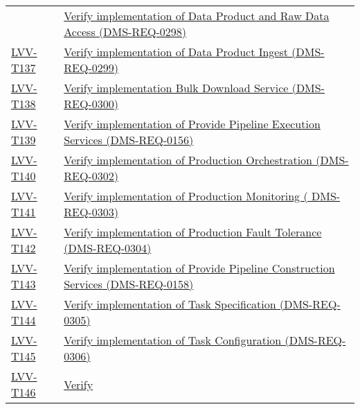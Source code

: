 \begin{longtable}[]{@{}ll@{}}
&
\href{https://jira.lsstcorp.org/secure/Tests.jspa\#/testCase/LVV-T136}{Verify
implementation of Data Product and Raw Data Access
(DMS-REQ-0298)}\tabularnewline
\protect\hyperlink{lvv-t137---verify-implementation-of-data-product-ingest-dms-req-0299}{LVV-T137}
&
\href{https://jira.lsstcorp.org/secure/Tests.jspa\#/testCase/LVV-T137}{Verify
implementation of Data Product Ingest (DMS-REQ-0299)}\tabularnewline
\protect\hyperlink{lvv-t138---verify-implementation-bulk-download-service-dms-req-0300}{LVV-T138}
&
\href{https://jira.lsstcorp.org/secure/Tests.jspa\#/testCase/LVV-T138}{Verify
implementation Bulk Download Service (DMS-REQ-0300)}\tabularnewline
\protect\hyperlink{lvv-t139---verify-implementation-of-provide-pipeline-execution-services-dms-req-0156}{LVV-T139}
&
\href{https://jira.lsstcorp.org/secure/Tests.jspa\#/testCase/LVV-T139}{Verify
implementation of Provide Pipeline Execution Services
(DMS-REQ-0156)}\tabularnewline
\protect\hyperlink{lvv-t140---verify-implementation-of-production-orchestration--dms-req-0302}{LVV-T140}
&
\href{https://jira.lsstcorp.org/secure/Tests.jspa\#/testCase/LVV-T140}{Verify
implementation of Production Orchestration
(DMS-REQ-0302)}\tabularnewline
\protect\hyperlink{lvv-t141---verify-implementation-of-production-monitoring--dms-req-0303}{LVV-T141}
&
\href{https://jira.lsstcorp.org/secure/Tests.jspa\#/testCase/LVV-T141}{Verify
implementation of Production Monitoring ( DMS-REQ-0303)}\tabularnewline
\protect\hyperlink{lvv-t142---verify-implementation-of-production-fault-tolerance-dms-req-0304}{LVV-T142}
&
\href{https://jira.lsstcorp.org/secure/Tests.jspa\#/testCase/LVV-T142}{Verify
implementation of Production Fault Tolerance
(DMS-REQ-0304)}\tabularnewline
\protect\hyperlink{lvv-t143---verify-implementation-of-provide-pipeline-construction-services-dms-req-0158}{LVV-T143}
&
\href{https://jira.lsstcorp.org/secure/Tests.jspa\#/testCase/LVV-T143}{Verify
implementation of Provide Pipeline Construction Services
(DMS-REQ-0158)}\tabularnewline
\protect\hyperlink{lvv-t144---verify-implementation-of-task-specification-dms-req-0305}{LVV-T144}
&
\href{https://jira.lsstcorp.org/secure/Tests.jspa\#/testCase/LVV-T144}{Verify
implementation of Task Specification (DMS-REQ-0305)}\tabularnewline
\protect\hyperlink{lvv-t145---verify-implementation-of-task-configuration-dms-req-0306}{LVV-T145}
&
\href{https://jira.lsstcorp.org/secure/Tests.jspa\#/testCase/LVV-T145}{Verify
implementation of Task Configuration (DMS-REQ-0306)}\tabularnewline
\protect\hyperlink{lvv-t146---verify-implementation-of-dms-initialization-component-dms-req-0297}{LVV-T146}
&
\href{https://jira.lsstcorp.org/secure/Tests.jspa\#/testCase/LVV-T146}{Verify
}
\end{longtable}
